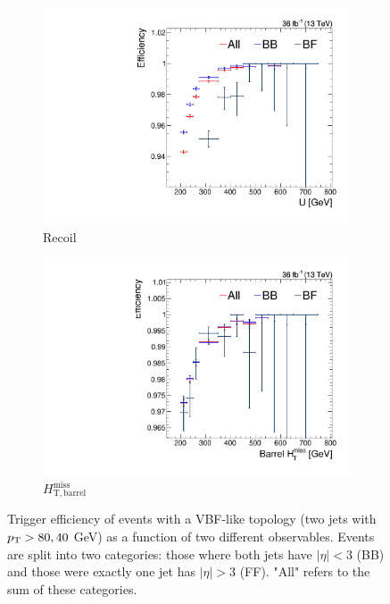\begin{figure}[]
    \begin{center}
        \begin{subfigure}[t]{0.49\textwidth}
            \includegraphics[width=\textwidth]{figures/vbf/triggers/trigeff_nmu1pfUWmag.pdf}
            \caption{Recoil}
            \label{fig:vbf:hlta}
        \end{subfigure}
        \begin{subfigure}[t]{0.49\textwidth}
            \includegraphics[width=\textwidth]{figures/vbf/triggers/trigeff_nmu1barrelHTMiss.pdf}
            \caption{$H_\mathrm{T,barrel}^\mathrm{miss}$}
            \label{fig:vbf:hltb}
        \end{subfigure}
        \caption{Trigger efficiency of events with a VBF-like topology (two jets with $p_\mathrm{T}>80,40$ GeV) as a function of two different observables.
                 Events are split into two categories: those where both jets have $|\eta|<3$ (BB) and those were exactly one jet has $|\eta|>3$ (FF).
                 "All" refers to the sum of these categories.}
        \label{fig:vbf:hlt}
    \end{center}
\end{figure}

